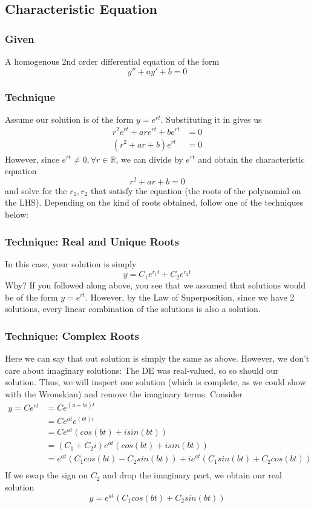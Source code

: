 \documentclass[11pt]{article}
\begin{document}
\subsection{Characteristic Equation }
\subsubsection{Given}
A homogenous 2nd order differential equation of the form 
\[ y'' + ay' + b = 0 \]
\subsubsection{Technique}
Assume our solution is of the form $y = e^{rt}$. Substituting it in gives us
\begin{align*}
    r^2e^{rt} + are^{rt} + be^{rt} &= 0 \\
    (r^2 + ar + b)e^{rt} &= 0
\end{align*}
However, since $e^{rt} \neq 0, \forall r \in \mathbb{R}$, we can divide by 
$e^{rt}$ and obtain the characteristic equation
    \[ r^2 + ar + b = 0 \]
and solve for the $r_1, r_2$ that satisfy the equation (the roots of the polynomial on the LHS). Depending
on the kind of roots obtained, follow one of the techniques below:
\subsubsection{Technique: Real and Unique Roots}
In this case, your solution is simply
    \[ y = C_1e^{r_1t} + C_2e^{r_2t} \]
Why? If you followed along above, you see that we assumed that solutions would be of the form $y = e^{rt}$.
However, by the Law of Superposition, since we have 2 solutions, every linear combination of the solutions
is also a solution.
\subsubsection{Technique: Complex Roots}
Here we can say that out solution is simply the same as above. However, we don't care about imaginary 
solutions: The DE was real-valued, so so should our solution. Thus, we will inspect one solution (which
is complete, as we could show with the Wronskian) and remove the imaginary terms. Consider
\begin{align*}
    y = Ce^{rt} &= Ce^{(a+bi)t} \\
    &= Ce^{at}e^{(bt)i} \\
    &= Ce^{at}(cos(bt) + isin(bt)) \\
    &= (C_1 + C_2i)e^{at}(cos(bt) + isin(bt)) \\
    &= e^{at}(C_1cos(bt) - C_2sin(bt)) + ie^{at}(C_1sin(bt) + C_2cos(bt))\\
\end{align*}
If we swap the sign on $C_2$ and drop the imaginary part, we obtain our real solution
\[ y = e^{at}(C_1cos(bt) + C_2sin(bt)) \]
\end{document}
